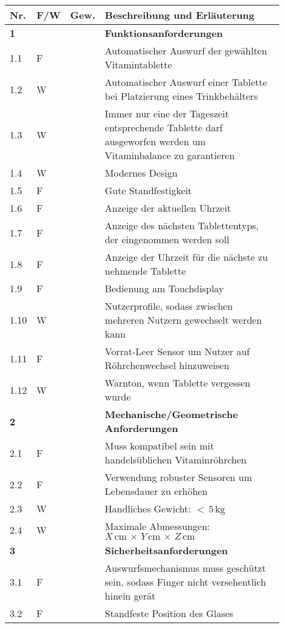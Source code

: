 \begin{longtable}{C{0.05\linewidth}C{0.05\linewidth}C{0.05\linewidth}L{0.75\linewidth}}
	\toprule
 	
 	\textbf{Nr.} & \textbf{F/W} & \textbf{Gew.} & \textbf{Beschreibung und Erläuterung}  \\
	
	\toprule
	\endfirsthead
	
	\textbf{1} & & & \textbf{Funktionsanforderungen}  \\
	1.1 & F & & Automatischer Auswurf der gewählten Vitamintablette\\
	1.2 & W & & Automatischer Auswurf einer Tablette bei Platzierung eines Trinkbehälters\\
	1.3 & W & & Immer nur eine der Tageszeit entsprechende Tablette darf ausgeworfen werden um Vitaminbalance zu garantieren \\
	1.4 & W & & Modernes Design \\
	1.5 & F & & Gute Standfestigkeit\\
	1.6 & F & & Anzeige der aktuellen Uhrzeit \\
	1.7 & F & & Anzeige des nächsten Tablettentyps, der eingenommen werden soll\\
	1.8 & F & & Anzeige der Uhrzeit für die nächste zu nehmende Tablette\\
	1.9 & F & & Bedienung am Touchdisplay\\
	1.10 & W & & Nutzerprofile, sodass zwischen mehreren Nutzern gewechselt werden kann \\
	1.11 & F & & Vorrat-Leer Sensor um Nutzer auf Röhrchenwechsel hinzuweisen \\
	1.12 & W & & Warnton, wenn Tablette vergessen wurde \\
	
	\midrule
	
	\textbf{2} & & & \textbf{Mechanische/Geometrische Anforderungen} \\
	2.1 & F & & Muss kompatibel sein mit handelsüblichen Vitaminröhrchen \\
	2.2 & F & & Verwendung robuster Sensoren um Lebensdauer zu erhöhen \\
	2.3 & W & & Handliches Gewicht: $<\,5\,\text{kg}$ \\
	2.4 & W & & Maximale Abmessungen: $X\,\text{cm}\,\times\,Y\,\text{cm}\,\times\,Z\,\text{cm}$ \\
	
	\midrule
	
	\textbf{3} & & & \textbf{Sicherheitsanforderungen} \\
	3.1 & F & & Auswurfsmechanismus muss geschützt sein, sodass Finger nicht versehentlich hinein gerät \\
	3.2 & F & & Standfeste Position des Glases \\
	

\end{longtable}
